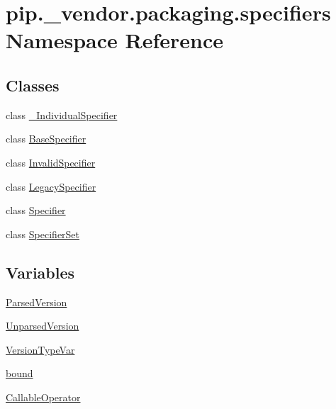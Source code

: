 \hypertarget{namespacepip_1_1__vendor_1_1packaging_1_1specifiers}{}\section{pip.\+\_\+vendor.\+packaging.\+specifiers Namespace Reference}
\label{namespacepip_1_1__vendor_1_1packaging_1_1specifiers}
\subsection*{Classes}
\begin{DoxyCompactItemize}
\item 
class \hyperlink{classpip_1_1__vendor_1_1packaging_1_1specifiers_1_1__IndividualSpecifier}{\+\_\+\+Individual\+Specifier}
\item 
class \hyperlink{classpip_1_1__vendor_1_1packaging_1_1specifiers_1_1BaseSpecifier}{Base\+Specifier}
\item 
class \hyperlink{classpip_1_1__vendor_1_1packaging_1_1specifiers_1_1InvalidSpecifier}{Invalid\+Specifier}
\item 
class \hyperlink{classpip_1_1__vendor_1_1packaging_1_1specifiers_1_1LegacySpecifier}{Legacy\+Specifier}
\item 
class \hyperlink{classpip_1_1__vendor_1_1packaging_1_1specifiers_1_1Specifier}{Specifier}
\item 
class \hyperlink{classpip_1_1__vendor_1_1packaging_1_1specifiers_1_1SpecifierSet}{Specifier\+Set}
\end{DoxyCompactItemize}
\subsection*{Variables}
\begin{DoxyCompactItemize}
\item 
\hyperlink{namespacepip_1_1__vendor_1_1packaging_1_1specifiers_acee0b1dcc79d080da6960ede6afe154d}{Parsed\+Version}
\item 
\hyperlink{namespacepip_1_1__vendor_1_1packaging_1_1specifiers_a72a62ad16de8c039a2c3293fcb57ea8c}{Unparsed\+Version}
\item 
\hyperlink{namespacepip_1_1__vendor_1_1packaging_1_1specifiers_a95ebabd947bde79473dbe702056b8d73}{Version\+Type\+Var}
\item 
\hyperlink{namespacepip_1_1__vendor_1_1packaging_1_1specifiers_abef0ac7ecd0fb1ad8c41530a908de670}{bound}
\item 
\hyperlink{namespacepip_1_1__vendor_1_1packaging_1_1specifiers_a6bd695ad18f9dc17d7ea2fc7b649b2ad}{Callable\+Operator}
\end{DoxyCompactItemize}


